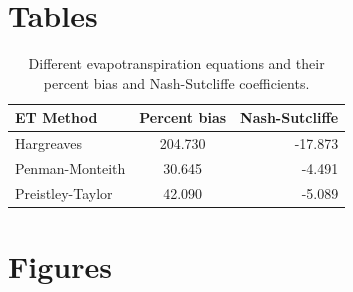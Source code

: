\section{Tables}

\begin{landscape}

\end{landscape}





\begin{table}[h!]
	\caption[Different evapotranspiration equations ]{Different evapotranspiration equations and their percent bias and Nash-Sutcliffe coefficients.}
	\centering
	\begin{tabular}{ l c r }
		\hline
		ET Method         &	Percent bias & Nash-Sutcliffe \\
		\hline	\hline
		Hargreaves        &	204.730	& 	-17.873	\\
		Penman-Monteith	  &	30.645	&	-4.491 	\\
		Preistley-Taylor  &	42.090	&	-5.089 	\\
		\hline
	\end{tabular}
	\label{table:et_method}
\end{table}	

\begin{landscape}
	
\end{landscape}

\section{Figures}

